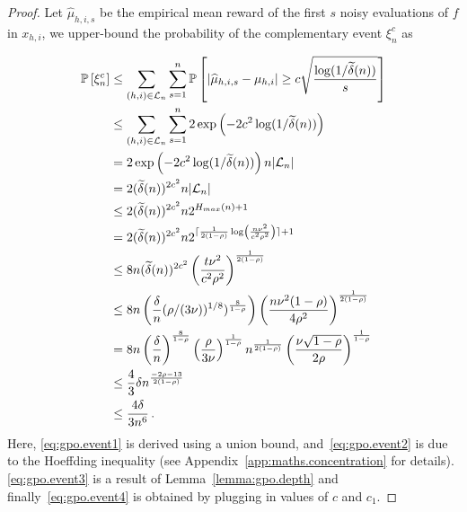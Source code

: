 \begin{proof}
Let $\hat{\mu}_{h,i,s}$ be the empirical mean reward of the first $s$ noisy evaluations of $f$ in $x_{h,i}$, we upper-bound the probability of the complementary event $\xi_n^c$ as

\begingroup
\allowdisplaybreaks
\begin{align}
    \mathbb{P}\left[ \xi_n^c \right]
    & \leq \sum_{(h,i)\in\mathcal{L}_n}\sum_{s=1}^{n} \mathbb{P}\left[ |\widehat{\mu}_{h,i,s} - \mu_{h,i}| \geq c\sqrt{\frac{\log(1/\widetilde{\delta}(n))}{s}} \right] \label{eq:gpo.event1} \\
    & \leq \sum_{(h,i)\in\mathcal{L}_n}\sum_{s=1}^{n} 2\operatorname{exp}\left( -2c^2\log(1/\widetilde{\delta}(n)) \right) \label{eq:gpo.event2} \\
    & = 2\operatorname{exp}\left( -2c^2\log(1/\widetilde{\delta}(n)) \right) n|\mathcal{L}_n| \nonumber \\
    & = 2(\widetilde{\delta}(n))^{2c^2}n|\mathcal{L}_n| \nonumber \\
    & \leq 2(\widetilde{\delta}(n))^{2c^2}n 2^{H_{max}(n)+1} \nonumber \\
    & = 2(\widetilde{\delta}(n))^{2c^2}n 2^{\lceil\frac{1}{2(1-\rho)}\log\left(\frac{n\nu^2}{c^2\rho^2} \right)\rceil+1} \label{eq:gpo.event3} \\
    & \leq 8n(\widetilde{\delta}(n))^{2c^2} \left( \frac{t\nu^2}{c^2\rho^2} \right)^{\frac{1}{2(1-\rho)}} \nonumber \\
    & \leq 8n\left(\frac{\delta}{n} (\rho/(3\nu))^{1/8})^{\frac{8}{1-\rho}}\right) \left( \frac{n\nu^2(1-\rho)}{4\rho^2}\right)^{\frac{1}{2(1-\rho)}} \label{eq:gpo.event4} \\
    & = 8n\left(\frac{\delta}{n}\right)^{\frac{8}{1-\rho}} \left(\frac{\rho}{3\nu}\right)^{\frac{1}{1-\rho}} n^{\frac{1}{2(1-\rho)}} \left( \frac{\nu\sqrt{1-\rho}}{2\rho}\right)^{\frac{1}{1-\rho}} \nonumber \\
    & \leq \frac{4}{3} \delta n^{\frac{-2\rho-13}{2(1-\rho)}} \nonumber \\
    & \leq \frac{4\delta}{3n^6} \nonumber \,.
\end{align}
\endgroup
Here, \eqref{eq:gpo.event1} is derived using a union bound, and~\eqref{eq:gpo.event2} is due to the Hoeffding inequality (see Appendix~\ref{app:maths.concentration} for details). \eqref{eq:gpo.event3} is a result of Lemma~\ref{lemma:gpo.depth} and finally~\eqref{eq:gpo.event4} is obtained by plugging in values of $c$ and $c_1$.
\end{proof}

